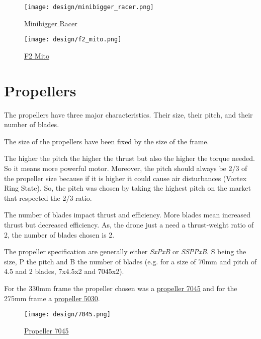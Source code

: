 \begin{figure}[!ht]
    \centering
    \texttt{[image: design/minibigger\_racer.png]}
    \caption{\href{https://www.banggood.com/Minibigger-Racer-255mm-275mm-Carbon-Fiber-4mm-Arm-RC-Drone-FPV-Racing-Frame-Kit-with-Wrench-Tools-p-1241634.html?rmmds=search&ID=228532758&cur_warehouse=CN}{Minibigger Racer}}
    \label{fig:minibiggerracer}
\end{figure}

\begin{figure}[!ht]
    \centering
    \texttt{[image: design/f2\_mito.png]}
    \caption{\href{https://www.banggood.com/F2-Mito-GS-Carbon-Fiber-195220250275mm-Freestyle-Stretch-X-Frame-Kit-for-RC-FPV-Racing-Drone-p-1319168.html?rmmds=search&ID=532758&cur_warehouse=CN}{F2 Mito}}
    \label{fig:f2mito}
\end{figure}

\section{Propellers}
The propellers have three major characteristics. Their size, their pitch, and their number of blades.

The size of the propellers have been fixed by the size of the frame.

The higher the pitch the higher the thrust but also the higher the torque needed. So it means more powerful motor. Moreover, the pitch should always be 2/3 of the propeller size because if it is higher it could cause air disturbances (Vortex Ring State). So, the pitch was chosen by taking the highest pitch on the market that respected the 2/3 ratio.

The number of blades impact thrust and efficiency. More blades mean increased thrust but decreased efficiency. As, the drone just a need a thrust-weight ratio of 2, the number of blades chosen is 2.

The propeller specification are generally either \emph{SxPxB} or \emph{SSPPxB}. S being the size, P the pitch and B the number of blades (e.g. for a size of 70mm and pitch of 4.5 and 2 blades, 7x4.5x2 and 7045x2).

For the 330mm frame the propeller chosen was a \hyperref[fig:7045]{propeller 7045} and for the 275mm frame a \hyperref[fig:5030]{propeller 5030}.

\begin{figure}[!ht]
    \centering
    \texttt{[image: design/7045.png]}
    \caption{\href{https://www.banggood.com/Style-7050-7x5-DD-Direct-Drive-Propeller-Blade-CW-CCW-For-RC-Airplane-p-1045332.html?rmmds=search&ID=45905&cur_warehouse=CN}{Propeller 7045}}
    \label{fig:7045}
\end{figure}

